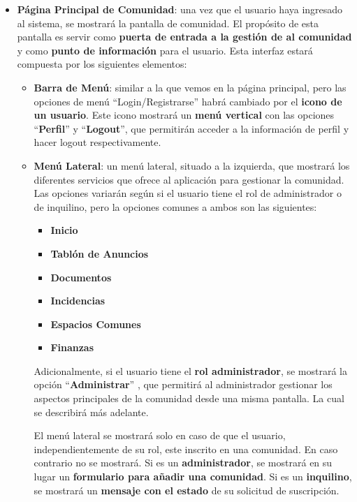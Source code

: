 \begin{appendices}
\begin{itemize}
	
	\item \textbf{Página Principal de Comunidad}: una vez que el usuario haya ingresado al sistema, se mostrará la pantalla de comunidad. El propósito de esta pantalla es servir como \textbf{puerta de entrada a la gestión de al comunidad} y como \textbf{punto de información} para el usuario. Esta interfaz estará compuesta por los siguientes elementos:
	
	\begin{itemize}
		\item \textbf{Barra de Menú}: similar a la que vemos en la página principal, pero las opciones de menú ``Login/Registrarse''  habrá cambiado por el \textbf{icono de un usuario}. Este icono mostrará un \textbf{menú vertical} con las opciones ``\textbf{Perfil}'' y ``\textbf{Logout}'', que permitirán acceder a la información de perfil y hacer \gls{logout} respectivamente.
		
		\item \textbf{Menú Lateral}: un menú lateral, situado a la izquierda, que mostrará los diferentes servicios que ofrece al aplicación para gestionar la comunidad. Las opciones variarán según si el usuario tiene el rol de administrador o de inquilino, pero la opciones comunes a ambos son las siguientes: 
		
		\begin{itemize}
			\item \textbf{Inicio}
			\item \textbf{Tablón de Anuncios}
			\item \textbf{Documentos}
			\item \textbf{Incidencias}
			\item \textbf{Espacios Comunes}
			\item \textbf{Finanzas}
		\end{itemize}
	
		 
		 Adicionalmente, si el usuario tiene el \textbf{rol administrador}, se mostrará la opción ``\textbf{Administrar}''	, que permitirá al administrador gestionar los aspectos principales de la comunidad desde una misma pantalla. La cual se describirá más adelante.
		 
		El menú lateral se mostrará solo en caso de que el usuario, independientemente de su rol, este inscrito en una comunidad. En caso contrario no se mostrará. Si es un \textbf{administrador}, se mostrará en su lugar un \textbf{formulario para añadir una comunidad}. Si es un \textbf{inquilino}, se mostrará un \textbf{mensaje con el estado} de su solicitud de suscripción.
		

\end{itemize}
\end{itemize}
\end{appendices}
